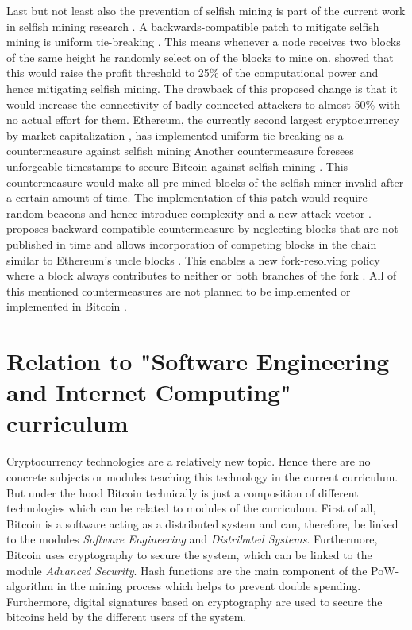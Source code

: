\documentclass{scrartcl}
\begin{document}
Last but not least also the prevention of selfish mining is part of the current work in selfish mining research \cite{eyal2014majority, billah2015one, solat2016zeroblock, zhang2017publish}.
A backwards-compatible patch to mitigate selfish mining is uniform tie-breaking \cite{eyal2014majority}.
This means whenever a node receives two blocks of the same height he randomly select on of the blocks to mine on.
\cite{eyal2014majority} showed that this would raise the profit threshold to 25\% of the computational power and hence mitigating selfish mining.
The drawback of this proposed change is that it would increase the connectivity of badly connected attackers to almost 50\% with no actual effort for them.
Ethereum, the currently second largest cryptocurrency by market capitalization \cite{marketcap2017}, has implemented uniform tie-breaking as a countermeasure against selfish mining \cite{gervais2016security, unifromtiebreakingethereum}
Another countermeasure foresees unforgeable timestamps to secure Bitcoin against selfish mining \cite{billah2015one}.
This countermeasure would make all pre-mined blocks of the selfish miner invalid after a certain amount of time.
The implementation of this patch would require random beacons and hence introduce complexity and a new attack vector \cite{billah2015one}.
\cite{zhang2017publish} proposes backward-compatible countermeasure by neglecting blocks that are not published in time and allows incorporation of competing blocks in the chain similar to Ethereum's uncle blocks \cite{wood2014ethereum}.
This enables a new fork-resolving policy where a block always contributes to neither or both branches of the fork \cite{zhang2017publish}.
All of this mentioned countermeasures are not planned to be implemented or implemented in Bitcoin \cite{bitcoin, bitcoinbip}.

\section{Relation to "Software Engineering and Internet Computing" curriculum}
Cryptocurrency technologies are a relatively new topic.
Hence there are no concrete subjects or modules teaching this technology in the current curriculum.
But under the hood Bitcoin technically is just a composition of different technologies which can be related to modules of the curriculum.
First of all, Bitcoin is a software acting as a distributed system and can, therefore, be linked to the modules \textit{Software Engineering} and \textit{Distributed Systems}.
Furthermore, Bitcoin uses cryptography to secure the system, which can be linked to the module \textit{Advanced Security}.
Hash functions are the main component of the PoW-algorithm in the mining process which helps to prevent double spending.
Furthermore, digital signatures based on cryptography are used to secure the bitcoins held by the different users of the system.
\end{document}
